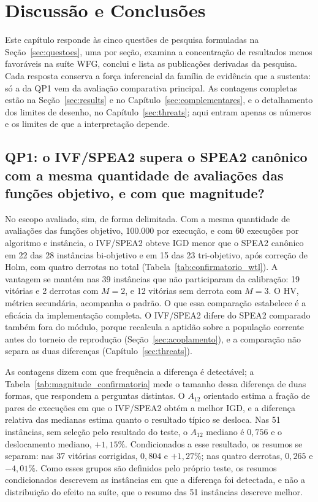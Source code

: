\chapter{Discussão e Conclusões}
\label{sec:discussion_conclusions}

Este capítulo responde às cinco questões de pesquisa formuladas na Seção~\ref{sec:questoes}, uma por seção, examina a concentração de resultados menos favoráveis na suíte WFG, conclui e lista as publicações derivadas da pesquisa. Cada resposta conserva a força inferencial da família de evidência que a sustenta: só a da QP1 vem da avaliação comparativa principal. As contagens completas estão na Seção~\ref{sec:results} e no Capítulo~\ref{sec:complementares}, e o detalhamento dos limites de desenho, no Capítulo~\ref{sec:threats}; aqui entram apenas os números e os limites de que a interpretação depende.

\section{QP1: o IVF/SPEA2 supera o SPEA2 canônico com a mesma quantidade de avaliações das funções objetivo, e com que magnitude?}
\label{sec:resposta_qp1}

No escopo avaliado, sim, de forma delimitada. Com a mesma quantidade de avaliações das funções objetivo, 100.000 por execução, e com 60 execuções por algoritmo e instância, o IVF/SPEA2 obteve IGD menor que o SPEA2 canônico em 22 das 28 instâncias bi-objetivo e em 15 das 23 tri-objetivo, após correção de Holm, com quatro derrotas no total (Tabela~\ref{tab:confirmatorio_wtl}). A vantagem se mantém nas 39 instâncias que não participaram da calibração: 19 vitórias e 2 derrotas com $M = 2$, e 12 vitórias sem derrota com $M = 3$. O HV, métrica secundária, acompanha o padrão. O que essa comparação estabelece é a eficácia da implementação completa. O IVF/SPEA2 difere do SPEA2 comparado também fora do módulo, porque recalcula a aptidão sobre a população corrente antes do torneio de reprodução (Seção~\ref{sec:acoplamento}), e a comparação não separa as duas diferenças (Capítulo~\ref{sec:threats}).

As contagens dizem com que frequência a diferença é detectável; a Tabela~\ref{tab:magnitude_confirmatoria} mede o tamanho dessa diferença de duas formas, que respondem a perguntas distintas. O $A_{12}$ orientado estima a fração de pares de execuções em que o IVF/SPEA2 obtém a melhor IGD, e a diferença relativa das medianas estima quanto o resultado típico se desloca. Nas 51 instâncias, sem seleção pelo resultado do teste, o $A_{12}$ mediano é $0{,}756$ e o deslocamento mediano, $+1{,}15\%$. Condicionados a esse resultado, os resumos se separam: nas 37 vitórias corrigidas, $0{,}804$ e $+1{,}27\%$; nas quatro derrotas, $0{,}265$ e $-4{,}01\%$. Como esses grupos são definidos pelo próprio teste, os resumos condicionados descrevem as instâncias em que a diferença foi detectada, e não a distribuição do efeito na suíte, que o resumo das 51 instâncias descreve melhor.

